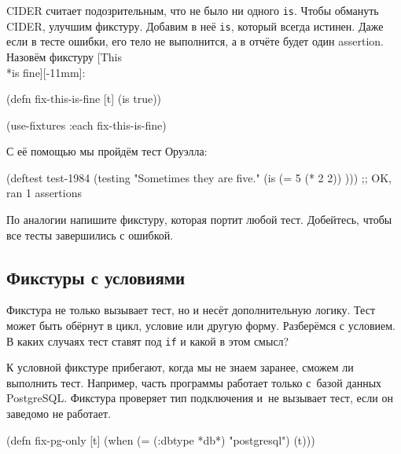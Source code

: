 
CIDER считает подозрительным, что не было ни одного \verb|is|. Чтобы обмануть
CIDER, улучшим фикстуру. Добавим в неё \verb|is|, который всегда истинен. Даже
если в тесте ошибки, его тело не выполнится, а в отчёте будет один
assertion. Назовём фикстуру [This\\*is fine][-11mm]:

\begin{english}
  \begin{clojure}
(defn fix-this-is-fine [t]
  (is true))

(use-fixtures :each fix-this-is-fine)
  \end{clojure}
\end{english}


С её помощью мы пройдём тест Оруэлла:

\begin{english}
  \begin{clojure}
(deftest test-1984
  (testing "Sometimes they are five."
    (is (= 5 (* 2 2)) )))
;; OK, ran 1 assertions
  \end{clojure}
\end{english}

По аналогии напишите фикстуру, которая портит любой тест. Добейтесь, чтобы все
тесты завершились с ошибкой.

\subsection{Фикстуры с условиями}


Фикстура не только вызывает тест, но и несёт дополнительную логику. Тест может
быть обёрнут в цикл, условие или другую форму. Разберёмся с условием. В
каких случаях тест ставят под \verb|if| и какой в этом смысл?

К условной фикстуре прибегают, когда мы не знаем заранее, сможем ли выполнить
тест. Например, часть программы работает только с~базой данных
PostgreSQL. Фикстура проверяет тип подключения и~не вызывает тест, если он
заведомо не работает.

\begin{english}
  \begin{clojure}
(defn fix-pg-only [t]
  (when (= (:dbtype *db*) "postgresql")
    (t)))
  \end{clojure}
\end{english}

